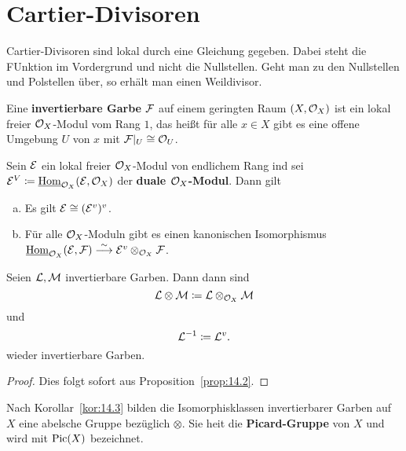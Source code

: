 
\chapter{Cartier-Divisoren}

Cartier-Divisoren sind lokal durch eine Gleichung gegeben. Dabei steht die FUnktion im Vordergrund und nicht die Nullstellen. Geht man zu den Nullstellen und Polstellen über, so erhält man einen Weildivisor. 

\begin{defn}
\label{defn:14.1}
	Eine \textbf{invertierbare Garbe} $\mathcal{F}$ auf einem geringten Raum $(X,\mathcal{O}_X)$ ist ein lokal freier $\mathcal{O}_X$-Modul vom Rang $1$, das heißt für alle $x \in X$ gibt es eine offene Umgebung $U$ von $x$ mit $\mathcal{F}\vert_U \cong \mathcal{O}_{U}$.
\end{defn}


\begin{prop}
\label{prop:14.2}
	Sein $\mathcal{E}$ ein lokal freier $\mathcal{O}_X$-Modul von endlichem Rang ind sei $\mathcal{E}^V \coloneqq \underline{\operatorname{Hom}}_{\mathcal{O}_X}(\mathcal{E},\mathcal{O}_X)$ der \textbf{duale $\mathcal{O}_X$-Modul}. Dann gilt
	\begin{enumerate}[a)]
		\item Es gilt $\mathcal{E} \cong (\mathcal{E}^v)^v$.
		\item Für alle $\mathcal{O}_X$-Moduln gibt es einen kanonischen Isomorphismus $\underline{\operatorname{Hom}}_{\mathcal{O}_X}(\mathcal{E},\mathcal{F}) \overset{\sim}{\longrightarrow} \mathcal{E}^v\otimes_{\mathcal{O}_X} \mathcal{F}$.
	\end{enumerate}
\end{prop}

\begin{kor}
\label{kor:14.3}
	Seien $\mathcal{L}, \mathcal{M}$ invertierbare Garben. Dann dann sind
	\[
		\mathcal{L} \otimes \mathcal{M} \coloneqq \mathcal{L} \otimes_{\mathcal{O}_X} \mathcal{M}
	\]
	und
	\[
		\mathcal{L}^{-1} \coloneqq \mathcal{L}^v.
	\]
	wieder invertierbare Garben.
	\begin{proof}
		Dies folgt sofort aus Proposition~\ref{prop:14.2}.
	\end{proof}
\end{kor}

\begin{defn}
\label{defn:14.4}
	Nach Korollar~\ref{kor:14.3} bilden die Isomorphisklassen invertierbarer Garben auf $X$ eine abelsche Gruppe bezüglich $\otimes$. Sie heit die \textbf{Picard-Gruppe} von $X$ und wird mit $\operatorname{Pic}(X)$ bezeichnet.
\end{defn}

